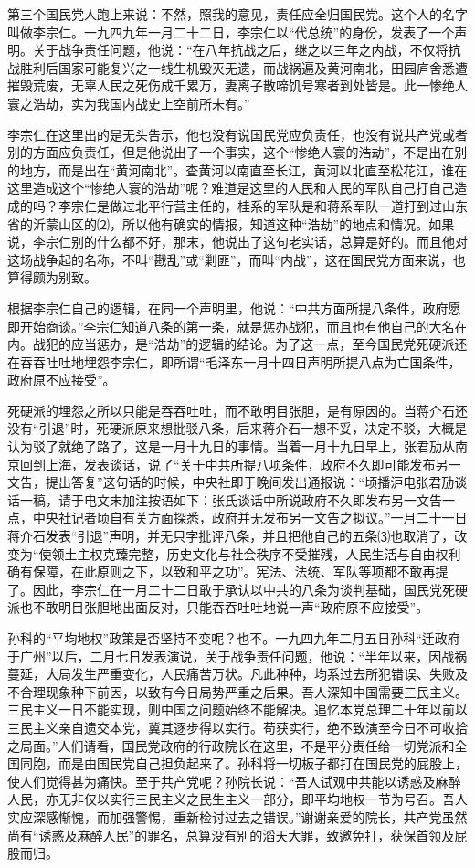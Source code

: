 \documentclass[UTF-8, a5paper, 12pt]{ctexart}
\begin{document}
第三个国民党人跑上来说：不然，照我的意见，责任应全归国民党。这个人的名字叫做李宗仁。一九四九年一月二十二日，李宗仁以“代总统”的身份，发表了一个声明。关于战争责任问题，他说：“在八年抗战之后，继之以三年之内战，不仅将抗战胜利后国家可能复兴之一线生机毁灭无遗，而战祸遍及黄河南北，田园庐舍悉遭摧毁荒废，无辜人民之死伤成千累万，妻离子散啼饥号寒者到处皆是。此一惨绝人寰之浩劫，实为我国内战史上空前所未有。”

李宗仁在这里出的是无头告示，他也没有说国民党应负责任，也没有说共产党或者别的方面应负责任，但是他说出了一个事实，这个“惨绝人寰的浩劫”，不是出在别的地方，而是出在“黄河南北”。查黄河以南直至长江，黄河以北直至松花江，谁在这里造成这个“惨绝人寰的浩劫”呢？难道是这里的人民和人民的军队自己打自己造成的吗？李宗仁是做过北平行营主任的，桂系的军队是和蒋系军队一道打到过山东省的沂蒙山区的⑵，所以他有确实的情报，知道这种“浩劫”的地点和情况。如果说，李宗仁别的什么都不好，那末，他说出了这句老实话，总算是好的。而且他对这场战争起的名称，不叫“戡乱”或“剿匪”，而叫“内战”，这在国民党方面来说，也算得颇为别致。

根据李宗仁自己的逻辑，在同一个声明里，他说：“中共方面所提八条件，政府愿即开始商谈。”李宗仁知道八条的第一条，就是惩办战犯，而且也有他自己的大名在内。战犯的应当惩办，是“浩劫”的逻辑的结论。为了这一点，至今国民党死硬派还在吞吞吐吐地埋怨李宗仁，即所谓“毛泽东一月十四日声明所提八点为亡国条件，政府原不应接受”。

死硬派的埋怨之所以只能是吞吞吐吐，而不敢明目张胆，是有原因的。当蒋介石还没有“引退”时，死硬派原来想批驳八条，后来蒋介石一想不妥，决定不驳，大概是认为驳了就绝了路了，这是一月十九日的事情。当着一月十九日早上，张君劢从南京回到上海，发表谈话，说了“关于中共所提八项条件，政府不久即可能发布另一文告，提出答复”这句话的时候，中央社即于晚间发出通报说：“顷播沪电张君劢谈话一稿，请于电文末加注按语如下：张氏谈话中所说政府不久即发布另一文告一点，中央社记者顷自有关方面探悉，政府并无发布另一文告之拟议。”一月二十一日蒋介石发表“引退”声明，并无只字批评八条，并且把他自己的五条⑶也取消了，改变为“使领土主权克臻完整，历史文化与社会秩序不受摧残，人民生活与自由权利确有保障，在此原则之下，以致和平之功”。宪法、法统、军队等项都不敢再提了。因此，李宗仁在一月二十二日敢于承认以中共的八条为谈判基础，国民党死硬派也不敢明目张胆地出面反对，只能吞吞吐吐地说一声“政府原不应接受”。

孙科的“平均地权”政策是否坚持不变呢？也不。一九四九年二月五日孙科“迁政府于广州”以后，二月七日发表演说，关于战争责任问题，他说：“半年以来，因战祸蔓延，大局发生严重变化，人民痛苦万状。凡此种种，均系过去所犯错误、失败及不合理现象种下前因，以致有今日局势严重之后果。吾人深知中国需要三民主义。三民主义一日不能实现，则中国之问题始终不能解决。追忆本党总理二十年以前以三民主义亲自遗交本党，冀其逐步得以实行。苟获实行，绝不致演至今日不可收拾之局面。”人们请看，国民党政府的行政院长在这里，不是平分责任给一切党派和全国同胞，而是由国民党自己担负起来了。孙科将一切板子都打在国民党的屁股上，使人们觉得甚为痛快。至于共产党呢？孙院长说：“吾人试观中共能以诱惑及麻醉人民，亦无非仅以实行三民主义之民生主义一部分，即平均地权一节为号召。吾人实应深感惭愧，而加强警惕，重新检讨过去之错误。”谢谢亲爱的院长，共产党虽然尚有“诱惑及麻醉人民”的罪名，总算没有别的滔天大罪，致邀免打，获保首领及屁股而归。
\end{document}
